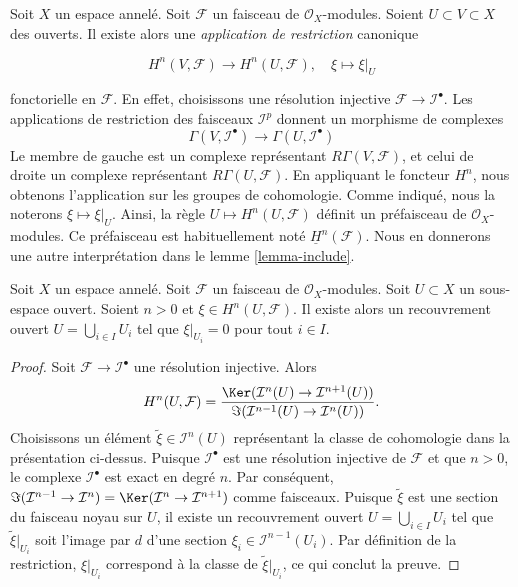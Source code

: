 \noindent

Soit $X$ un espace annelé. Soit $\mathcal{F}$ un faisceau de $\mathcal{O}_X$-modules. Soient $U \subset V \subset X$ des ouverts. Il existe alors une {\it application de restriction} canonique

\begin{equation}
\label{equation-restriction-mapping}
H^n(V, \mathcal{F})
\longrightarrow
H^n(U, \mathcal{F}), \quad
\xi \longmapsto \xi|_U
\end{equation}

fonctorielle en $\mathcal{F}$. En effet, choisissons une résolution injective $\mathcal{F} \to \mathcal{I}^\bullet$. Les applications de restriction des faisceaux $\mathcal{I}^p$ donnent un morphisme de complexes
$$
\Gamma(V, \mathcal{I}^\bullet)
\longrightarrow
\Gamma(U, \mathcal{I}^\bullet)
$$
Le membre de gauche est un complexe représentant $R\Gamma(V, \mathcal{F})$,
et celui de droite un complexe représentant $R\Gamma(U, \mathcal{F})$. En appliquant le foncteur $H^n$, nous obtenons l'application sur les groupes de cohomologie. Comme indiqué, nous la noterons $\xi \mapsto \xi|_U$. Ainsi, la règle $U \mapsto H^n(U, \mathcal{F})$ définit un préfaisceau de
$\mathcal{O}_X$-modules. Ce préfaisceau est habituellement noté
$\underline{H}^n(\mathcal{F})$. Nous en donnerons une autre interprétation dans le lemme \ref{lemma-include}.

\begin{lemma}

\label{lemma-kill-cohomology-class-on-covering}
Soit $X$ un espace annelé. Soit $\mathcal{F}$ un faisceau de $\mathcal{O}_X$-modules. Soit $U \subset X$ un sous-espace ouvert. Soient $n > 0$ et $\xi \in H^n(U, \mathcal{F})$. Il existe alors un recouvrement ouvert $U = \bigcup_{i\in I} U_i$ tel que $\xi|_{U_i} = 0$ pour tout $i \in I$.
\end{lemma}

\begin{proof}

Soit $\mathcal{F} \to \mathcal{I}^\bullet$ une résolution injective. Alors
$$
H^n(U, \mathcal{F}) =
\frac{\Ker(\mathcal{I}^n(U) \to \mathcal{I}^{n + 1}(U))}
{\Im(\mathcal{I}^{n - 1}(U) \to \mathcal{I}^n(U))}.
$$
Choisissons un élément $\tilde \xi \in \mathcal{I}^n(U)$ représentant la classe de cohomologie dans la présentation ci-dessus. Puisque $\mathcal{I}^\bullet$
est une résolution injective de $\mathcal{F}$ et que $n > 0$, le complexe $\mathcal{I}^\bullet$ est exact en degré $n$. Par conséquent,
$\Im(\mathcal{I}^{n - 1} \to \mathcal{I}^n) =
\Ker(\mathcal{I}^n \to \mathcal{I}^{n + 1})$ comme faisceaux. Puisque $\tilde \xi$ est une section du faisceau noyau sur $U$,
il existe un recouvrement ouvert $U = \bigcup_{i \in I} U_i$
tel que $\tilde \xi|_{U_i}$ soit l'image par $d$ d'une section
$\xi_i \in \mathcal{I}^{n - 1}(U_i)$. Par définition de la restriction, $\xi|_{U_i}$ correspond à la classe de
$\tilde \xi|_{U_i}$, ce qui conclut la preuve.

\end{proof}

